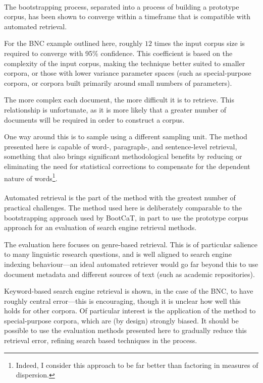 \paragraph{}

The bootstrapping process, separated into a process of building a prototype corpus, has been shown to converge within a timeframe that is compatible with automated retrieval.

For the BNC example outlined here, roughly $12$ times the input corpus size is required to converge with 95\% confidence.  This coefficient is based on the complexity of the input corpus, making the technique better suited to smaller corpora, or those with lower variance parameter spaces (such as special-purpose corpora, or corpora built primarily around small numbers of parameters).

The more complex each document, the more difficult it is to retrieve.  This relationship is unfortunate, as it is more likely that a greater number of documents will be required in order to construct a corpus.

One way around this is to sample using a different sampling unit.  The method presented here is capable of word-, paragraph-, and sentence-level retrieval, something that also brings significant methodological benefits by reducing or eliminating the need for statistical corrections to compensate for the dependent nature of words\footnote{Indeed, I consider this approach to be far better than factoring in measures of dispersion.}.



\paragraph{}

Automated retrieval is the part of the method with the greatest number of practical challenges. The method used here is deliberately comparable to the bootstrapping approach used by BootCaT\cite{baroni2004bootcat}, in part to use the prototype corpus approach for an evaluation of search engine retrieval methods.

The evaluation here focuses on genre-based retrieval.  This is of particular salience to many linguistic research questions, and is well aligned to search engine indexing behaviour---an ideal automated retriever would go far beyond this to use document metadata and different sources of text (such as academic repositories).

Keyword-based search engine retrieval is shown, in the case of the BNC, to have roughly central error---this is encouraging, though it is unclear how well this holds for other corpora.  Of particular interest is the application of the method to special-purpose corpora, which are (by design) strongly biased.  It should be possible to use the evaluation methods presented here to gradually reduce this retrieval error, refining search based techniques in the process.

